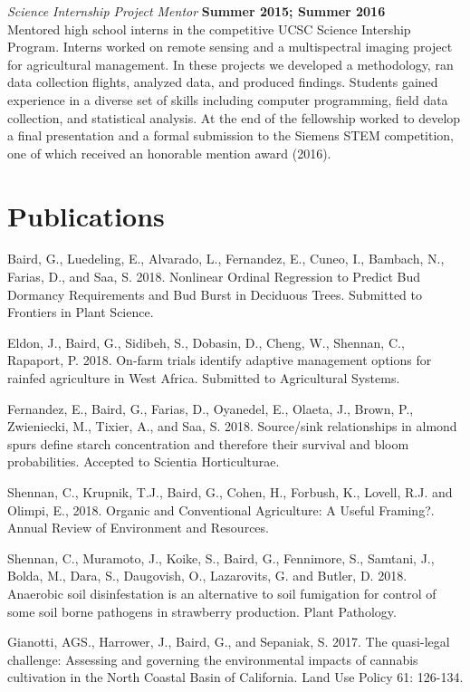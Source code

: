 \documentclass{res}
\begin{document}
\begin{resume}
		{\em Science Internship Project Mentor} \hfill {\bf Summer 2015; Summer 2016}\\
		Mentored high school interns in the competitive UCSC Science Intership Program. Interns worked on remote sensing and a multispectral imaging project for agricultural management. In these projects we developed a methodology, ran data collection flights, analyzed data, and produced findings. Students gained experience in a diverse set of skills including computer programming, field data collection, and statistical analysis. At the end of the fellowship worked to develop a final presentation and a formal submission to the Siemens STEM competition, one of which received an honorable mention award (2016).
		
				
		\section{\sc Publications}
		Baird, G., Luedeling, E., Alvarado, L., Fernandez, E., Cuneo, I., Bambach, N., Farias, D., and Saa, S. 2018. Nonlinear Ordinal Regression to Predict Bud Dormancy Requirements and Bud Burst in Deciduous Trees. Submitted to Frontiers in Plant Science. 
		
		Eldon, J., Baird, G., Sidibeh, S., Dobasin, D., Cheng, W., Shennan, C., Rapaport, P. 2018. On-farm trials identify adaptive management options for rainfed agriculture in West Africa. Submitted to Agricultural Systems.
		
		Fernandez, E., Baird, G., Farias, D., Oyanedel, E., Olaeta, J., Brown, P., Zwieniecki, M., Tixier, A., and Saa, S. 2018. Source/sink relationships in almond spurs define starch concentration and therefore their survival and bloom probabilities. Accepted to Scientia Horticulturae. 
		
		Shennan, C., Krupnik, T.J., Baird, G., Cohen, H., Forbush, K., Lovell, R.J. and Olimpi, E., 2018. Organic and Conventional Agriculture: A Useful Framing?. Annual Review of Environment and Resources.
		
		Shennan, C., Muramoto, J., Koike, S., Baird, G., Fennimore, S., Samtani, J., Bolda, M., Dara, S., Daugovish, O., Lazarovits, G. and Butler, D. 2018. Anaerobic soil disinfestation is an alternative to soil fumigation for control of some soil borne pathogens in strawberry production. Plant Pathology.
		
		Gianotti, AGS., Harrower, J., Baird, G., and Sepaniak, S. 2017. The quasi-legal challenge: Assessing and governing the environmental impacts of cannabis cultivation in the North Coastal Basin of California. Land Use Policy 61: 126-134.
		

\end{resume}
\end{document}
